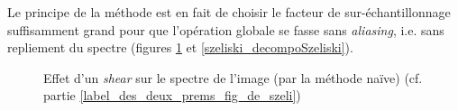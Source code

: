 	Le principe de la méthode est en fait de choisir le facteur de sur-échantillonnage suffisamment grand pour que l'opération globale se fasse sans \emph{aliasing}, i.e. sans repliement du spectre (figures \ref{szeliski_decompoNaive} et \ref{szeliski_decompoSzeliski}).
		\label{label_des_deux_prems_fig_de_szeli}
	\begin{figure}
		\centering
		\caption{Effet d'un \emph{shear} sur le spectre de l'image (par la méthode naïve) (cf. partie \ref{label_des_deux_prems_fig_de_szeli})}
		\label{szeliski_decompoNaive}
	\end{figure}
		
